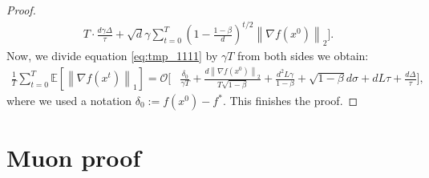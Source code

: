 \documentclass{article}
\theoremstyle{plain}
\theoremstyle{definition}
\theoremstyle{remark}
\newcommand{\expect}[1]{\mathbb{E}\left[ #1 \right]}
\newcommand{\norm}[1]{\left\| #1 \right\|}
\begin{document}
\begin{proof}
\begin{equation}
\begin{split}
                T \cdot \frac{d \gamma \Delta}{\tau} 
                + 
                \sqrt{d} \gamma \sum_{t=0}^T \left( 1 - \frac{1 - \beta}{d} \right)^{t/2} \norm{\nabla f(x^0)}_2
            \Bigg] .
        \end{split}
        \end{equation}
        Now, we divide equation \eqref{eq:tmp_1111} by $\gamma T$ from both sides we obtain:
        \begin{equation*}
        \begin{split}
            \frac{1}{T} \sum_{t=0}^T \expect{\norm{\nabla f(x^t)}_1}
            =
            \mathcal{O} \Bigg[ 
                &\frac{\delta_0}{\gamma T}
                +
                \frac{d \norm{\nabla f(x^0)}_2}{T \sqrt{1 - \beta}}
                +
                \frac{d^2 L \gamma}{1-\beta}  
                +
                \sqrt{1-\beta}d \sigma
                +
                d L \tau
                +
                \frac{d \Delta}{\tau} 
            \Bigg],
        \end{split}
        \end{equation*}
        where we used a notation $\delta_0 := f(x^0) - f^*$. This finishes the proof.
    \end{proof}

\section{Muon proof}
\end{document}
